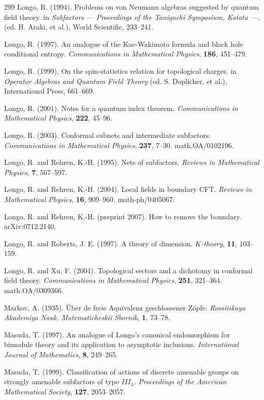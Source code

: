 \documentclass[12pt]{article}
\theoremstyle{plain}
\theoremstyle{definition}
\numberwithin{equation}{section}
\begin{document}
\begin{thebibliography} {299}
Longo, R. (1994).
Problems on von Neumann algebras suggested by
quantum field theory.
in {\em Subfactors --- Proceedings of the Taniguchi Symposium, Katata ---},
(ed. H. Araki, et al.),
World Scientific, 233--241.

Longo, R. (1997).
An analogue of the Kac-Wakimoto formula and black hole
conditional entropy.
{\em Communications in Mathematical Physics},
{\bf 186}, 451--479.

Longo, R. (1999).
On the spin-statistics relation for topological charges.
in {\em Operator Algebras and Quantum Field Theory}
(ed. S. Doplicher, et al.), International Press, 661--669.

Longo, R. (2001).
Notes for a quantum index theorem.
{\em Communications in Mathematical Physics},
{\bf 222}, 45--96.

Longo, R. (2003).
Conformal subnets and intermediate subfactors.
{\em Communications in Mathematical Physics},
{\bf 237}, 7--30.
math.OA/0102196.

Longo, R. and Rehren, K.-H. (1995).
Nets of subfactors.
{\em Reviews in Mathematical Physics},
{\bf 7}, 567--597.

Longo, R. and Rehren, K.-H. (2004).
Local fields in boundary CFT.
{\em Reviews in Mathematical Physics},
{\bf 16}, 909--960.
math-ph/0405067.

Longo, R. and Rehren, K.-H. (preprint 2007).
How to remove the boundary.
arXiv:0712.2140.

Longo, R. and Roberts, J. E. (1997).
A theory of dimension.
{\em $K$-theory}, {\bf 11}, 103--159.

Longo, R. and Xu, F. (2004).
Topological sectors and a dichotomy in conformal field theory.
{\em Communications in Mathematical Physics}, {\bf 251}, 321--364.
math.OA/0309366.

Markov, A. (1935).
\"Uber de freie Aquivalenz geschlossener Z\"opfe.
{\em Rossiiskaya Akademiya Nauk, Matematicheskii Sbornik}, {\bf 1}, 73--78.

Masuda, T. (1997). An analogue of Longo's canonical endomorphism for
bimodule theory and its application to asymptotic inclusions.
{\em International Journal of Mathematics},
{\bf 8}, 249--265.

Masuda, T. (1999). Classification of actions of discrete amenable groups on
strongly amenable subfactors of type $III_\lambda$.
{\em Proceedings of the American Mathematical Society},
{\bf 127}, 2053--2057.


\end{thebibliography}
\end{document}
